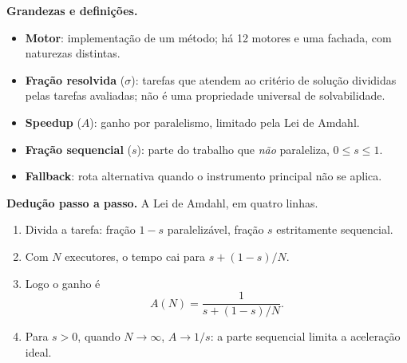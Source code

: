 \begin{definicao}
\textbf{Grandezas e definições.}
\begin{itemize}[leftmargin=1.3em,itemsep=1pt]
  \item \textbf{Motor}: implementação de um método; há 12 motores e uma fachada, com naturezas distintas.
  \item \textbf{Fração resolvida} ($\sigma$): tarefas que atendem ao critério de solução divididas pelas tarefas avaliadas; não é uma propriedade universal de solvabilidade.
  \item \textbf{Speedup} ($A$): ganho por paralelismo, limitado pela Lei de Amdahl.
  \item \textbf{Fração sequencial} ($s$): parte do trabalho que \emph{não} paraleliza, $0 \le s \le 1$.
  \item \textbf{Fallback}: rota alternativa quando o instrumento principal não se aplica.
\end{itemize}
\end{definicao}

\begin{metodo}
\textbf{Dedução passo a passo.} A Lei de Amdahl, em quatro linhas.
\begin{enumerate}[leftmargin=1.4em,itemsep=2pt]
  \item Divida a tarefa: fração $1-s$ paralelizável, fração $s$ estritamente sequencial.
  \item Com $N$ executores, o tempo cai para $s + (1-s)/N$.
  \item Logo o ganho é \[ A(N) = \frac{1}{s + (1-s)/N}. \]
  \item Para $s>0$, quando $N \to \infty$, $A \to 1/s$: a parte sequencial limita a aceleração ideal.
\end{enumerate}
\end{metodo}


